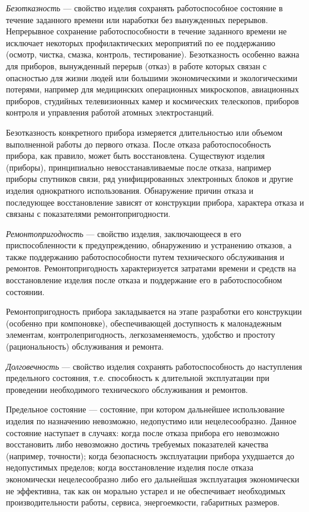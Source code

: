 \textit{Безотказность} --- свойство изделия сохранять работоспособное состояние в течение заданного времени или наработки без вынужденных перерывов. Непрерывное сохранение работоспособности в течение заданного времени не исключает некоторых профилактических мероприятий по ее поддержанию (осмотр, чистка, смазка, контроль, тестирование). Безотказность особенно важна для приборов, вынужденный перерыв (отказ) в работе которых связан с опасностью для жизни людей или большими экономическими и экологическими потерями, например для медицинских операционных микроскопов, авиационных приборов, студийных телевизионных камер и космических телескопов, приборов контроля и управления работой атомных электростанций.

Безотказность конкретного прибора измеряется длительностью или объемом выполненной работы до первого отказа. После отказа работоспособность прибора, как правило, может быть восстановлена. Существуют изделия (приборы), принципиально невосстанавливаемые после отказа, например приборы спутников связи, ряд унифицированных электронных блоков и другие изделия однократного использования. Обнаружение причин отказа и последующее восстановление зависят от конструкции прибора, характера отказа и связаны с показателями ремонтопригодности.

\textit{Ремонтопригодность} --- свойство изделия, заключающееся в его приспособленности к предупреждению, обнаружению и устранению отказов, а также поддержанию работоспособности путем технического обслуживания и ремонтов. Ремонтопригодность характеризуется затратами времени и средств на восстановление изделия после отказа и поддержание его в работоспособном состоянии.

Ремонтопригодность прибора закладывается на этапе разработки его конструкции (особенно при компоновке), обеспечивающей доступность к малонадежным элементам, контролепригодность, легкозаменяемость, удобство и простоту (рациональность) обслуживания и ремонта.

\textit{Долговечность} --- свойство изделия сохранять работоспособность до наступления предельного состояния, т.е. способность к длительной эксплуатации при проведении необходимого технического обслуживания и ремонтов.

Предельное состояние --- состояние, при котором дальнейшее использование изделия по назначению невозможно, недопустимо или нецелесообразно. Данное состояние наступает в случаях: когда после отказа прибора его невозможно восстановить либо невозможно достичь требуемых показателей качества (например, точности); когда безопасность эксплуатации прибора ухудшается до недопустимых пределов; когда восстановление изделия после отказа экономически нецелесообразно либо его дальнейшая эксплуатация экономически не эффективна, так как он морально устарел и не обеспечивает необходимых производительности работы, сервиса, энергоемкости, габаритных размеров.

